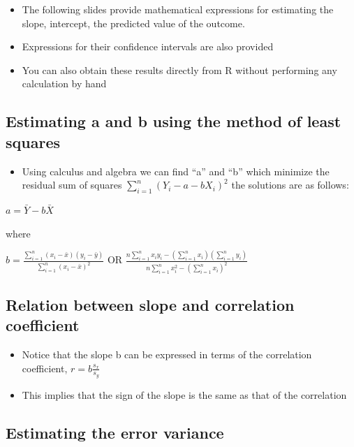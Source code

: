 \documentclass[
]{book}
\providecommand{\tightlist}{%
  \setlength{\itemsep}{0pt}\setlength{\parskip}{0pt}}
\begin{document}
\begin{itemize}
\tightlist
\item
  The following slides provide mathematical expressions for estimating the slope, intercept, the predicted value of the outcome.
\item
  Expressions for their confidence intervals are also provided
\item
  You can also obtain these results directly from R without performing any calculation by hand
\end{itemize}

\hypertarget{estimating-a-and-b-using-the-method-of-least-squares}{%
\subsection{Estimating a and b using the method of least squares}\label{estimating-a-and-b-using-the-method-of-least-squares}}

\begin{itemize}
\tightlist
\item
  Using calculus and algebra we can find ``a'' and ``b'' which minimize the residual sum of squares \(\sum_{i=1}^n(Y_i-a-bX_i)^2\) the solutions are as follows:
\end{itemize}

\(a=\bar Y-b\bar X\)

where

\(b = \frac{\sum_{i=1}^n(x_i-\bar x)(y_i-\bar y)}{\sum_{i=1}^n(x_i-\bar x)^2}\) OR \(\frac{n\sum_{i=1}^nx_iy_i-(\sum_{i=1}^nx_i)(\sum_{i=1}^ny_i)}{n\sum_{i=1}^nx_i^2-(\sum_{i=1}^nx_i)^2}\)

\hypertarget{relation-between-slope-and-correlation-coefficient}{%
\subsection{Relation between slope and correlation coefficient}\label{relation-between-slope-and-correlation-coefficient}}

\begin{itemize}
\tightlist
\item
  Notice that the slope b can be expressed in terms of the correlation coefficient, \(r=b\frac{s_x}{s_y}\)
\item
  This implies that the sign of the slope is the same as that of the correlation
\end{itemize}

\hypertarget{estimating-the-error-variance}{%
\subsection{Estimating the error variance}\label{estimating-the-error-variance}}
\end{document}
